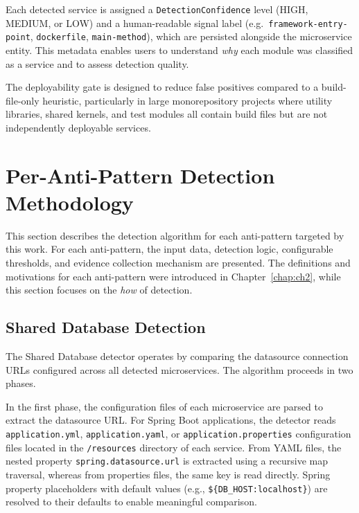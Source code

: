 Each detected service is assigned a \texttt{DetectionConfidence} level (HIGH, MEDIUM, or LOW) and a human-readable signal label (e.g.\ \texttt{framework-entry-point}, \texttt{docker\-file}, \texttt{main-method}), which are persisted alongside the microservice entity. This metadata enables users to understand \textit{why} each module was classified as a service and to assess detection quality.

The deployability gate is designed to reduce false positives compared to a build-file-only heuristic, particularly in large monorepository projects where utility libraries, shared kernels, and test modules all contain build files but are not independently deployable services.

\section{Per-Anti-Pattern Detection Methodology}
\label{sec:per-anti-pattern-detection}

\par This section describes the detection algorithm for each anti-pattern targeted by this work. For each anti-pattern, the input data, detection logic, configurable thresholds, and evidence collection mechanism are presented. The definitions and motivations for each anti-pattern were introduced in Chapter~\ref{chap:ch2}, while this section focuses on the \textit{how} of detection.

\subsection{Shared Database Detection}
\label{subsec:detect-shared-database}

\par The Shared Database detector operates by comparing the datasource connection URLs configured across all detected microservices. The algorithm proceeds in two phases.

In the first phase, the configuration files of each microservice are parsed to extract the datasource URL. For Spring Boot applications, the detector reads \texttt{app\-li\-ca\-tion.yml}, \texttt{application.yaml}, or \texttt{application.properties} configuration files located in the \texttt{/resources} directory of each service. From YAML files, the nested property \texttt{spring.datasource.url} is extracted using a recursive map traversal, whereas from properties files, the same key is read directly. Spring property placeholders with default values (e.g., \texttt{\$\{DB\_HOST:localhost\}}) are resolved to their defaults to enable meaningful comparison.

